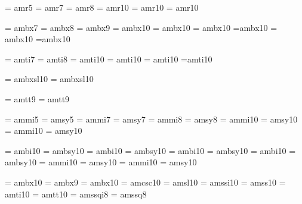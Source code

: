 \Font\prmfive	= amr5
\Font\prmseven	= amr7
\Font\prmeight	= amr8
\Font\prmten	= amr10
\Font\prmeleven = amr10 \sc \mh
\Font\prmtwelve = amr10 \sc \mi

\Font\prbseven	= ambx7
\Font\prbeight	= ambx8
\Font\prbnine	= ambx9
\Font\prbten	= ambx10
\Font\prbeleven = ambx10 \sc \mh
\Font\prbtwelve = ambx10 \sc \mi
\Font\prbfourteen=ambx10 \sc \mii
\Font\prbsixteen= ambx10 \sc \miii
\Font\prbeighteen=ambx10 \sc \miii

\Font\priseven	= amti7
\Font\prieight	= amti8
\Font\priten	= amti10
\Font\prieleven = amti10 \sc \mh
\Font\pritwelve = amti10 \sc \mi
\Font\prifourteen=amti10 \sc \mii

\Font\prbiten	= ambxsl10
\Font\prbieleven= ambxsl10 \sc \mh

\Font\lgseven	= amtt9
\Font\lgnine	= amtt9

\font\mifive	= ammi5			\font\syfive	= amsy5
\font\miseven	= ammi7			\font\syseven	= amsy7
\font\mieight	= ammi8			\font\syeight	= amsy8
\font\miten	= ammi10		\font\syten	= amsy10
\font\mieleven	= ammi10 \sc \mh	\font\syeleven	= amsy10 \sc \mh

\font\bmiten	 = ambi10		\font\bsyten	 = ambsy10
\font\bmieleven	 = ambi10 \sc \mh	\font\bsyeleven	 = ambsy10 \sc \mh
\font\bmitwelve	 = ambi10 \sc \mi	\font\bsytwelve	 = ambsy10 \sc \mi
\font\bmifourteen= ambi10 \sc \mii	\font\bsyfourteen= ambsy10 \sc \mii
\font\bmisixteen = ammi10 \sc \miii	\font\bsysixteen = amsy10  \sc \miii
\font\bmieighteen= ammi10 \sc \miii	\font\bsyeighteen= amsy10  \sc \miii


\font\bbften = ambx10
\font\bbfnine = ambx9
\Font\bbflten = ambx10 \sc \mi
\font\bscten = amcsc10
\font\bslten = amsl10
\font\ssiten = amssi10
\font\bssten = amss10
\font\bitten = amti10
\font\bttten = amtt10
\font\ssqieight = amssqi8
\font\ssqeight = amssq8

